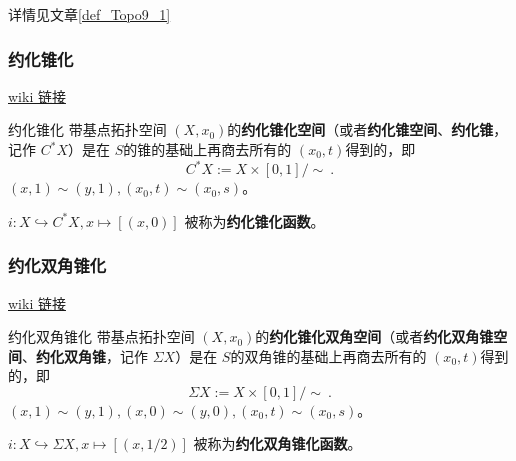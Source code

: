 详情见文章\autoref{def_Topo9_1} 


\subsubsection{约化锥化}

\href{https://en.wikipedia.org/wiki/Cone_(topology)\%5C#Reduced_cone}{wiki 链接}

\begin{definition}{约化锥化}
带基点拓扑空间 $(X, x_0)$的\textbf{约化锥化空间}（或者\textbf{约化锥空间}、\textbf{约化锥}，记作 $C^* X$）是在 $S$的锥的基础上再商去所有的 $(x_0, t)$得到的，即
\[
    C^* X := X \times [0,1] / \sim~.
\]
$(x, 1) \sim (y, 1), (x_0, t) \sim (x_0, s)$。

$i: X \hookrightarrow C^* X, x \mapsto [(x, 0)]$ 被称为\textbf{约化锥化函数}。
\end{definition}

\subsubsection{约化双角锥化}

\href{https://en.wikipedia.org/wiki/Suspension_(topology)\%5C#Reduced_suspension}{wiki 链接}

\begin{definition}{约化双角锥化}
带基点拓扑空间 $(X, x_0)$的\textbf{约化锥化双角空间}（或者\textbf{约化双角锥空间}、\textbf{约化双角锥}，记作 $\Sigma X$）是在 $S$的双角锥的基础上再商去所有的 $(x_0, t)$得到的，即
\[
    \Sigma X := X \times [0,1] / \sim~.
\]
$(x, 1) \sim (y, 1), (x, 0) \sim (y, 0), (x_0, t) \sim (x_0, s)$。

$i: X \hookrightarrow \Sigma X, x \mapsto [(x, 1/2)]$ 被称为\textbf{约化双角锥化函数}。
\end{definition}


